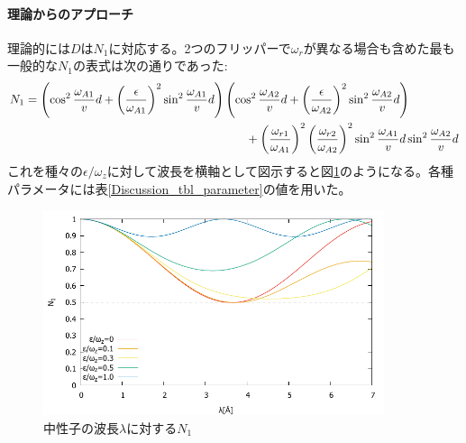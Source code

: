 \paragraph{理論からのアプローチ}
理論的には$D$は$N_1$に対応する。2つのフリッパーで$\omega_r$が異なる場合も含めた最も一般的な$N_1$の表式は次の通りであった:
\begin{align}
&N_1 = \left(\cos^2 \frac{\omega_{A1}}{v}d +\left(\frac{\epsilon}{\omega_{A1}}\right)^2\sin^2 \frac{\omega_{A1}}{v}d\right)\left(\cos^2 \frac{\omega_{A2}}{v}d+\left(\frac{\epsilon}{\omega_{A2}}\right)^2 \sin^2 \frac{\omega_{A2}}{v}d\right)\\ \notag
&\hspace{7cm}+\left(\frac{\omega_{r1}}{\omega_{A1}}\right)^2\left(\frac{\omega_{r2}}{\omega_{A2}}\right)^2 \sin^2 \frac{\omega_{A1}}{v}d \sin^2 \frac{\omega_{A2}}{v}d
\end{align}
これを種々の$\epsilon/\omega_z$に対して波長を横軸として図示すると図\ref{Discussion_fig_N1}のようになる。各種パラメータには表\ref{Discussion_tbl_parameter}の値を用いた。
\begin{figure}[h]
\centering
\includegraphics[width=10cm]{discussion/D/N1.pdf}
\caption{中性子の波長$\lambda$に対する$N_1$}\label{Discussion_fig_N1}
\end{figure}

